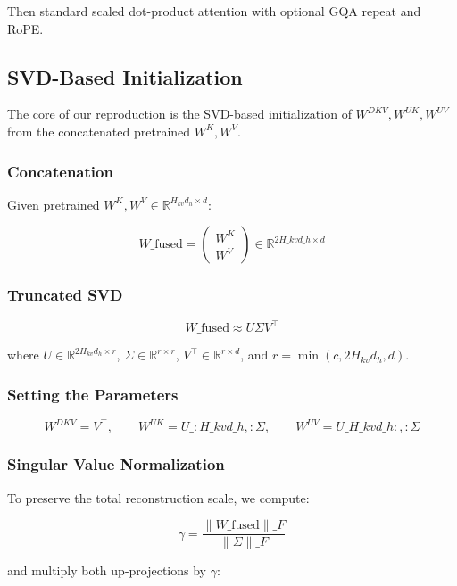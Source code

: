 Then standard scaled dot-product attention with optional GQA repeat and 
RoPE.

\subsection{SVD-Based Initialization}

The core of our reproduction is the SVD-based initialization of 
$W^{DKV}, W^{UK}, W^{UV}$ from the concatenated pretrained $W^K, W^V$.

\subsubsection{Concatenation}

Given pretrained $W^K, W^V \in \mathbb{R}^{H_{kv} d_h \times d}$:

\[
W\_\text{fused} = \begin{pmatrix} W^K \\ W^V \end{pmatrix} \in \mathbb{R}^{2 H\_{kv} d\_h \times d}
\tag{4.2}
\]

\subsubsection{Truncated SVD}

\[
W\_\text{fused} \approx U \Sigma V^\top
\tag{4.3}
\]

where $U \in \mathbb{R}^{2 H_{kv} d_h \times r}$, $\Sigma \in \mathbb{R}^{r \times r}$, 
$V^\top \in \mathbb{R}^{r \times d}$, and $r = \min(c, 2 H_{kv} d_h, d)$.

\subsubsection{Setting the Parameters}

\[
W^{DKV} = V^\top, \qquad
W^{UK} = U\_{:H\_{kv} d\_h, :} \Sigma, \qquad
W^{UV} = U\_{H\_{kv} d\_h:, :} \Sigma
\tag{4.4}
\]

\subsubsection{Singular Value Normalization}

To preserve the total reconstruction scale, we compute:

\[
\gamma = \frac{\|W\_\text{fused}\|\_F}{\|\Sigma\|\_F}
\tag{4.5}
\]

and multiply both up-projections by $\gamma$:

